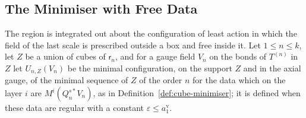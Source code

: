 \documentclass[11pt]{preprint}
\numberwithin{equation}{section}
\begin{document}
\subsection{The Minimiser with Free Data}\label{sec:free-data}

The region is integrated out about the configuration of least action in which the field of the last scale is prescribed outside a box and free inside it. Let $1 \leqslant n \leqslant k$, let $Z$ be a union of cubes of $\mathsf r_n$, and for a gauge field $V_n$ on the bonds of $T^{(n)}$ in $Z$ let $U_{n,Z}(V_n)$ be the minimal configuration, on the support $Z$ and in the axial gauge, of the minimal sequence of $Z$ of the order $n$ for the data which on the layer $i$ are $M^i(Q^{s*}_nV_n)$, as in Definition~\ref{def:cube-minimiser}; it is defined when these data are regular with a constant $\varepsilon \leqslant a^{\mathrm v}_1$.
\end{document}
